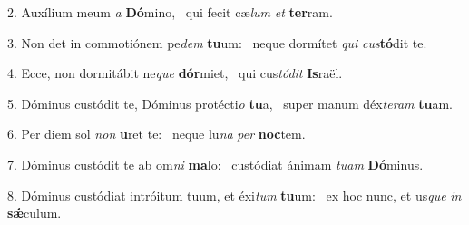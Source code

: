 2. Auxílium meum \textit{a} \textbf{Dó}mino, \ast\  qui fecit cæ\textit{lum} \textit{et} \textbf{ter}ram.\

3. Non det in commotiónem pe\textit{dem} \textbf{tu}um: \ast\  neque dormítet \textit{qui} \textit{cus}\textbf{tó}dit te.\

4. Ecce, non dormitábit ne\textit{que} \textbf{dór}miet, \ast\  qui cus\textit{tó}\textit{dit} \textbf{Is}raël.\

5. Dóminus custódit te, Dóminus protécti\textit{o} \textbf{tu}a, \ast\  super manum déx\textit{te}\textit{ram} \textbf{tu}am.\

6. Per diem sol \textit{non} \textbf{u}ret te: \ast\  neque lu\textit{na} \textit{per} \textbf{noc}tem.\

7. Dóminus custódit te ab om\textit{ni} \textbf{ma}lo: \ast\  custódiat ánimam \textit{tu}\textit{am} \textbf{Dó}minus.\

8. Dóminus custódiat intróitum tuum, et éxi\textit{tum} \textbf{tu}um: \ast\  ex hoc nunc, et us\textit{que} \textit{in} \textbf{sǽ}culum.\

